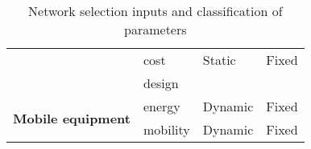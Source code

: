 \begin{table}[h!]
\begin{tabular}{l|l|l|l}
	\                                                  & cost                    & Static        & Fixed      \\
	\                                                  & design                  &               &            \\\hline
	\multirow{2}{*}{\textbf{Mobile equipment}}         & energy                  & Dynamic       & Fixed      \\
	\                                                  & mobility                & Dynamic       & Fixed      \\\hline
	\end{tabular}
	\caption{\label{tab:network_selection} Network selection inputs and classification of parameters \cite{bendaoud_network_2019}}
\end{table}



